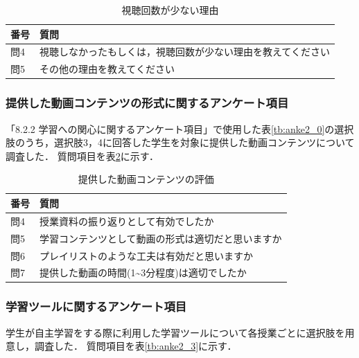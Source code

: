 \documentclass[12pt,a4j,titlepage]{ltjsarticle}
\begin{document}
\begin{table}[htbp]
  \caption{視聴回数が少ない理由}
  \begin{center}
\begin{tabular}{ll}\hline
               番号 & 質問 \\ \hline
               問4 & 視聴しなかったもしくは，視聴回数が少ない理由を教えてください\\
               問5 & その他の理由を教えてください\\
              \hline
               \end{tabular}
               \end{center}
               \label{tb:anke2_1}
               \end{table}


\subsubsection{提供した動画コンテンツの形式に関するアンケート項目}
「8.2.2 学習への関心に関するアンケート項目」で使用した表\ref{tb:anke2_0}の選択肢のうち，選択肢3，4に回答した学生を対象に提供した動画コンテンツについて調査した．
質問項目を表\ref{tb:anke2_2}に示す．

\begin{table}[htbp]
  \caption{提供した動画コンテンツの評価}
  \begin{center}
\begin{tabular}{ll}\hline
               番号 & 質問 \\ \hline
               問4 & 授業資料の振り返りとして有効でしたか\\
               問5 & 学習コンテンツとして動画の形式は適切だと思いますか\\
               問6 & プレイリストのような工夫は有効だと思いますか\\
               問7 & 提供した動画の時間(1\textasciitilde3分程度)は適切でしたか\\
              \hline
               \end{tabular}
               \end{center}
               \label{tb:anke2_2}
               \end{table}

\clearpage


\subsubsection{学習ツールに関するアンケート項目}
学生が自主学習をする際に利用した学習ツールについて各授業ごとに選択肢を用意し，調査した．
質問項目を表\ref{tb:anke2_3}に示す．
\end{document}
